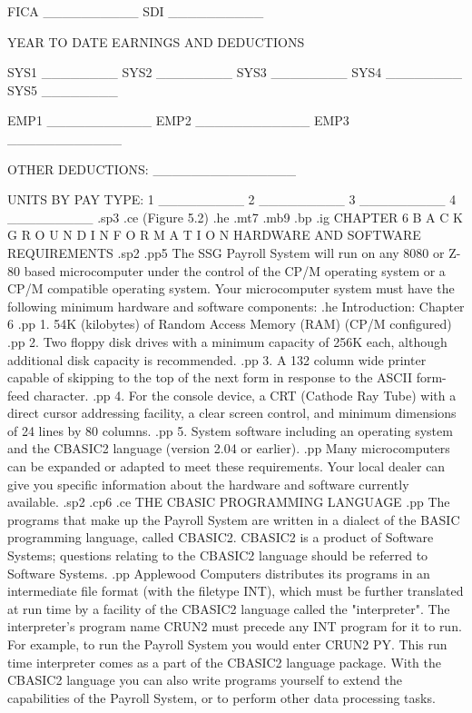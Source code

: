 		 FICA __________  SDI __________



	      YEAR TO DATE EARNINGS AND DEDUCTIONS

SYS1 ________ SYS2 ________ SYS3 ________ SYS4 ________ SYS5 ________

	  EMP1 ___________  EMP2 ____________  EMP3 ____________

OTHER DEDUCTIONS: _______________

UNITS BY PAY TYPE: 1 _________	2 _________  3 _________  4 _________
.sp3
.ce
(Figure 5.2)
.he
.mt7
.mb9
.bp
.ig
CHAPTER 6
B A C K G R O U N D   I N F O R M A T I O N
HARDWARE AND SOFTWARE REQUIREMENTS
.sp2
.pp5
The SSG Payroll System
will run on any 8080 or Z-80 based microcomputer
under the control of the CP/M operating system or a CP/M compatible
operating system.  Your microcomputer system must have the following
minimum hardware and software components:
.he Introduction: Chapter 6
.pp
1.  54K (kilobytes) of Random Access Memory (RAM)  (CP/M configured)
.pp
2.  Two floppy disk drives with a minimum capacity of 256K each,
although additional disk capacity is recommended.
.pp
3.  A 132 column wide printer capable of skipping to the top of the next
form in response to the ASCII form-feed character.
.pp
4.  For the console device, a CRT (Cathode Ray Tube) with a direct cursor
addressing facility, a clear screen control, and
minimum dimensions
of 24 lines by 80 columns.
.pp
5.  System software including an operating system and the CBASIC2 language
(version 2.04 or earlier).
.pp
Many microcomputers can be expanded or adapted to meet these requirements.
Your local dealer can give you specific information about the hardware
and software currently available.
.sp2
.cp6
.ce
THE CBASIC PROGRAMMING LANGUAGE
.pp
The programs that make up the Payroll System are written
in a dialect of the BASIC programming language, called CBASIC2.
CBASIC2 is a product of Software Systems; questions relating to
the CBASIC2 language should be referred to Software Systems.
.pp
Applewood Computers distributes its programs in an intermediate
file format (with the filetype INT), which must be further translated
at run time by a
facility of the CBASIC2 language called the "interpreter".  The interpreter's
program name CRUN2 must precede any INT program for it to run.
For example, to run the Payroll System you would enter CRUN2 PY.
This run time interpreter comes as a part of the CBASIC2
language package.
With the CBASIC2 language you
can also write programs yourself to extend the capabilities
of the Payroll
System, or to perform other data processing tasks.
